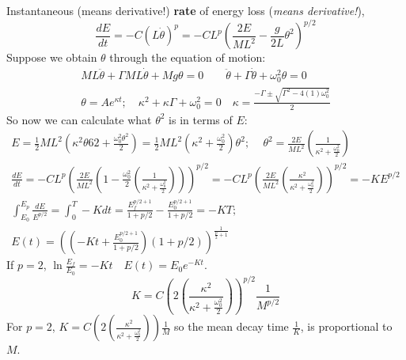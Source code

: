 \documentclass[twoside,10pt]{amsart}
\begin{document}
Instantaneous (means derivative!) \textbf{rate} of energy loss (\emph{means derivative!}),
\[
\frac{dE}{dt} = -C(L\dot{\theta})^p = -CL^p \left( \frac{2E}{ML^2} - \frac{g}{2L}\theta^2 \right)^{p/2}
\]
Suppose we obtain $\theta$ through the equation of motion:
\[
\begin{gathered}
  ML \ddot{\theta} + \Gamma M L \dot{\theta} + Mg \theta = 0 \quad \quad \ddot{\theta} + \Gamma \dot{\theta} + \omega_0^2 \theta = 0 \\
  \theta = A e^{\kappa t}; \quad \kappa^2 + \kappa \Gamma + \omega_0^2 = 0 \quad \kappa = \frac{ -\Gamma \pm \sqrt{ \Gamma^2 - 4(1) \omega_0^2 }}{ 2}
\end{gathered}
\]
So now we can calculate what $\theta^2$ is in terms of $E$:
\[
\begin{gathered}
  E = \frac{1}{2} ML^2 \left( \kappa^2 \theta62 + \frac{ \omega_0^2 \theta^2}{2} \right) = \frac{1}{2} ML^2 \left( \kappa^2 + \frac{ \omega_0^2}{ 2 } \right) \theta^2; \quad \, \theta^2 = \frac{2E}{ML^2} \left( \frac{1}{ \kappa^2 + \frac{ \omega_0^2}{ 2 }  } \right)  \\
  \frac{dE}{dt} = -CL^p \left( \frac{2E}{ML^2} \left( 1 - \frac{\omega_0^2}{2} \left( \frac{1}{ \kappa^2 + \frac{\omega_0^2}{ 2} } \right) \right) \right)^{p/2} = -CL^p \left( \frac{2E}{ML^2} \left( \frac{ \kappa^2}{ \kappa^2 + \frac{\omega_0^2}{2} } \right) \right)^{p/2} = -K E^{p/2} \\
  \int_{E_0}^{E_p} \frac{dE}{E^{p/2}} = \int_0^T - K dt = \frac{E_f^{p/2 + 1 } }{ 1 + p/2} - \frac{E_0^{p/2 +1}}{ 1 + p/2} = -KT; \\
  E(t) = \left( \left( -Kt + \frac{E_0^{p/2+1}}{ 1 + p/2} \right)(1+ p/2) \right)^{\frac{1}{ \frac{p}{2} + 1 } }
\end{gathered}
\]
If $p=2$, \quad $\ln{ \frac{E_f}{E_0} } = - Kt \quad \boxed{ E(t) = E_0 e^{-K t} }$.  
\[
K = C \left( 2 \left( \frac{ \kappa^2}{ \kappa^2 + \frac{\omega_0^2}{2} } \right) \right)^{p/2} \frac{1}{ M^{p/2}}
\]
For $p=2$, $K = C \left( 2 \left( \frac{ \kappa^2}{ \kappa^2 + \frac{ \omega_0^2}{ 2 } } \right) \right) \frac{1}{M}$ so the mean decay time $\frac{1}{K}$, is proportional to $M$.  
\end{document}
